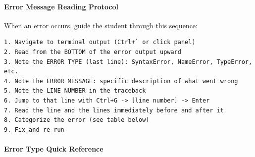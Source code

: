 \documentclass[
  justified,
  openright,
]{tufte-book}
\let\subsubsection\paragraph
\let\paragraph\paragraph
\let\subsubsection\paragraph
\let\paragraph\paragraph
\begin{document}
\subsubsection{Error Message Reading
Protocol}\label{error-message-reading-protocol}

When an error occurs, guide the student through this sequence:

\begin{verbatim}
1. Navigate to terminal output (Ctrl+` or click panel)
2. Read from the BOTTOM of the error output upward
3. Note the ERROR TYPE (last line): SyntaxError, NameError, TypeError, etc.
4. Note the ERROR MESSAGE: specific description of what went wrong
5. Note the LINE NUMBER in the traceback
6. Jump to that line with Ctrl+G -> [line number] -> Enter
7. Read the line and the lines immediately before and after it
8. Categorize the error (see table below)
9. Fix and re-run
\end{verbatim}

\subsubsection{Error Type Quick
Reference}\label{error-type-quick-reference}
\end{document}
